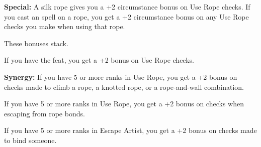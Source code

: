 \textbf{Special:} A silk rope gives you a +2 circumstance bonus on Use Rope checks. 
If you cast an  spell on a rope, you get a +2 circumstance 
bonus on any Use Rope checks you make when using that rope.

These bonuses stack.

If you have the  feat, you get a +2 bonus on Use Rope checks.

\textbf{Synergy:} If you have 5 or more ranks in Use Rope, you get a +2 bonus on 
 checks made to climb a rope, a knotted rope, or a rope-and-wall combination.

If you have 5 or more ranks in Use Rope, you get a +2 bonus on  checks 
when escaping from rope bonds.

If you have 5 or more ranks in Escape Artist, you get a +2 bonus on checks made 
to bind someone.
